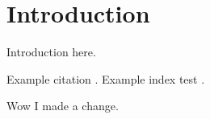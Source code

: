 \chapter{Introduction}
Introduction here. 

Example citation \cite{Blame}.
Example index test .\par 
Wow I made a change.

